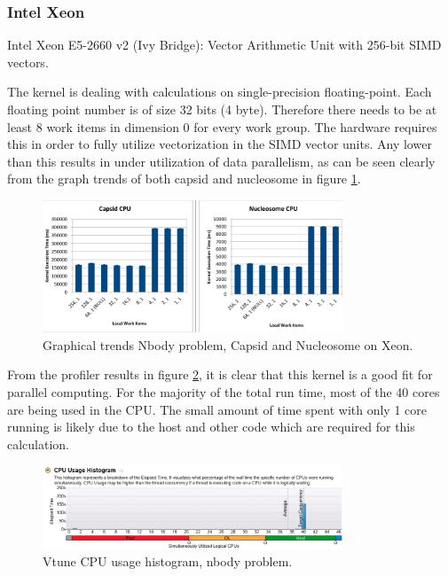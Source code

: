 \subsubsection{Intel Xeon}
\par{ {\color{red}Intel Xeon E5-2660 v2 (Ivy Bridge): Vector Arithmetic Unit with 256-bit SIMD vectors.}}

\par{The kernel is dealing with calculations on single-precision floating-point. 
    Each floating point number is of size 32 bits (4 byte). Therefore there needs 
    to be at least 8 work items in dimension 0 for every work group. The hardware 
    requires this in order to fully utilize vectorization in the SIMD vector units. 
    Any lower than this results in under utilization of data parallelism, {\color{red}as can be seen 
    clearly from the graph trends of both capsid and nucleosome in figure \ref{nbody_xeon}.}}

\begin{figure}[!h]
    \centering
    \includegraphics[width=0.8\textwidth]{figures/nbody_xeon.png}
    \caption{Graphical trends Nbody problem, Capsid and Nucleosome on Xeon.}
    \label{nbody_xeon}
\end{figure}

\par{From the profiler results in figure \ref{nbody_vtune}, 
    it is clear that this kernel is a good fit for parallel computing. 
    For the majority of the total run time, most of the 40 cores are being used in the CPU. 
    The small amount of time spent with only 1 core running is likely due to the host and other 
    code which are required for this calculation.}

\begin{figure}[!h]
    \centering
    \includegraphics[width=0.8\textwidth]{figures/nbody_vtune.png}
    \caption{Vtune CPU usage histogram, nbody problem.}
    \label{nbody_vtune}
\end{figure}

